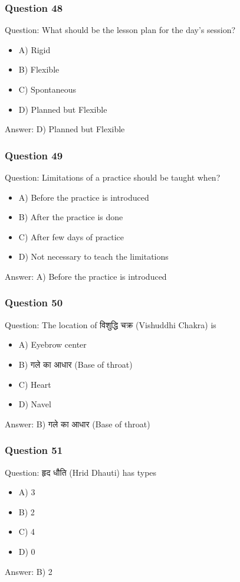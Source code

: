 \begin{frame}[fragile]\frametitle{Question 48}
Question: What should be the lesson plan for the day's session?
\begin{itemize}
\item A) Rigid
\item B) Flexible
\item C) Spontaneous
\item D) Planned but Flexible
\end{itemize}
Answer: D) Planned but Flexible
\end{frame}

\begin{frame}[fragile]\frametitle{Question 49}
Question: Limitations of a practice should be taught when?
\begin{itemize}
\item A) Before the practice is introduced
\item B) After the practice is done
\item C) After few days of practice
\item D) Not necessary to teach the limitations
\end{itemize}
Answer: A) Before the practice is introduced
\end{frame}

\begin{frame}[fragile]\frametitle{Question 50}
Question: The location of विशुद्धि चक्र (Vishuddhi Chakra) is
\begin{itemize}
\item A) Eyebrow center
\item B) गले का आधार (Base of throat)
\item C) Heart
\item D) Navel
\end{itemize}
Answer: B) गले का आधार (Base of throat)
\end{frame}

\begin{frame}[fragile]\frametitle{Question 51}
Question: हृद धौति (Hrid Dhauti) has types
\begin{itemize}
\item A) 3
\item B) 2
\item C) 4
\item D) 0
\end{itemize}
Answer: B) 2
\end{frame}

